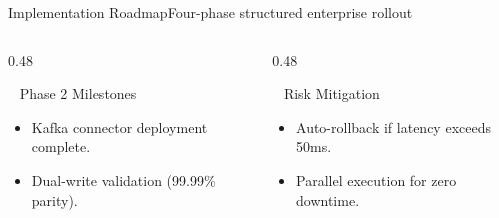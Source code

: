 \documentclass[aspectratio=169, 10pt]{beamer}
\newenvironment{compactitemize}{%
  \begin{itemize}%
    \setlength{\itemsep}{1pt}%
    \setlength{\parskip}{0pt}%
    \setlength{\parsep}{0pt}%
}{%
  \end{itemize}%
}
\begin{document}
\begin{frame}{Implementation Roadmap}{Four-phase structured enterprise rollout}
  \vspace*{0.2cm}
  \begin{columns}[T]
    \begin{column}{0.48\textwidth}
      \begin{featurebox}{\faTasks~ Phase 2 Milestones}
        \small
        \begin{compactitemize}
          \item Kafka connector deployment complete.
          \item Dual-write validation (99.99\% parity).
        \end{compactitemize}
      \end{featurebox}
    \end{column}
    \begin{column}{0.48\textwidth}
      \begin{featurebox}{\faExclamationTriangle~ Risk Mitigation}
        \small
        \begin{compactitemize}
          \item Auto-rollback if latency exceeds 50ms.
          \item Parallel execution for zero downtime.
        \end{compactitemize}
      \end{featurebox}
    \end{column}
  \end{columns}
\end{frame}

\end{document}
